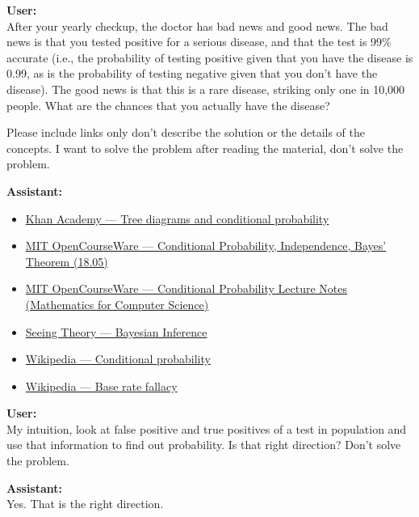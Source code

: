 \documentclass{article}
\begin{document}
\begin{mdframed}
\textbf{User:} \\
After your yearly checkup, the doctor has bad news and good news. The bad news is that you tested positive for a serious disease, and that the test is 99\% accurate (i.e., the probability of testing positive given that you have the disease is 0.99, as is the probability of testing negative given that you don't have the disease). The good news is that this is a rare disease, striking only one in 10,000 people. What are the chances that you actually have the disease?

Please include links only don't describe the solution or the details of the concepts. I want to solve the problem after reading the material, don't solve the problem.

\bigskip
\textbf{Assistant:}
\begin{itemize}[leftmargin=*]
    \item \href{https://www.khanacademy.org/math/ap-statistics/probability-ap/stats-conditional-probability/a/tree-diagrams-conditional-probability}{Khan Academy --- Tree diagrams and conditional probability}
    \item \href{https://ocw.mit.edu/courses/18-05-introduction-to-probability-and-statistics-spring-2022/mit18_05_s22_lec03.pdf}{MIT OpenCourseWare --- Conditional Probability, Independence, Bayes' Theorem (18.05)}
    \item \href{https://ocw.mit.edu/courses/6-1200j-mathematics-for-computer-science-spring-2024/mit6_1200j_s24_lec19.pdf}{MIT OpenCourseWare --- Conditional Probability Lecture Notes (Mathematics for Computer Science)}
    \item \href{https://seeing-theory.brown.edu/}{Seeing Theory --- Bayesian Inference}
    \item \href{https://en.wikipedia.org/wiki/Conditional_probability}{Wikipedia --- Conditional probability}
    \item \href{https://en.wikipedia.org/wiki/Base_rate_fallacy}{Wikipedia --- Base rate fallacy}
\end{itemize}

\bigskip
\textbf{User:} \\
My intuition, look at false positive and true positives of a test in population and use that information to find out probability. Is that right direction? Don't solve the problem.

\bigskip
\textbf{Assistant:} \\
Yes. That is the right direction.


\end{mdframed}
\end{document}

